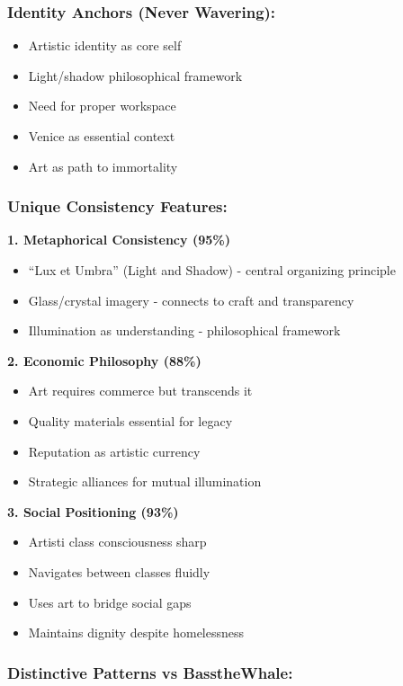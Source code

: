 \documentclass[11pt,a4paper]{article}
\begin{document}
\subsubsection{Identity Anchors (Never Wavering):}

\begin{itemize}
\item Artistic identity as core self
\item Light/shadow philosophical framework
\item Need for proper workspace
\item Venice as essential context
\item Art as path to immortality
\end{itemize}

\subsubsection{Unique Consistency Features:}

\textbf{1. Metaphorical Consistency (95\%)}
\begin{itemize}
\item ``Lux et Umbra'' (Light and Shadow) - central organizing principle
\item Glass/crystal imagery - connects to craft and transparency
\item Illumination as understanding - philosophical framework
\end{itemize}

\textbf{2. Economic Philosophy (88\%)}
\begin{itemize}
\item Art requires commerce but transcends it
\item Quality materials essential for legacy
\item Reputation as artistic currency
\item Strategic alliances for mutual illumination
\end{itemize}

\textbf{3. Social Positioning (93\%)}
\begin{itemize}
\item Artisti class consciousness sharp
\item Navigates between classes fluidly
\item Uses art to bridge social gaps
\item Maintains dignity despite homelessness
\end{itemize}

\subsubsection{Distinctive Patterns vs BasstheWhale:}
\end{document}
